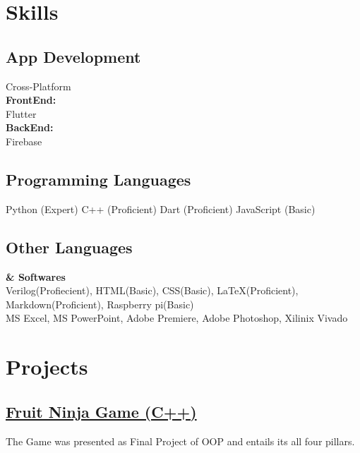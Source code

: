 \documentclass[]{plushcv}
\begin{document}
\begin{minipage}[t]{0.40\textwidth}



\section{Skills}
\subsection{App Development}
Cross-Platform\\
\textbf{FrontEnd:}\\ Flutter \\
\textbf{BackEnd:}\\ Firebase \\

\subsection{Programming Languages}
Python (Expert)
C++ (Proficient)
Dart (Proficient)
JavaScript (Basic)

\subsection{Other Languages}
\textbf{\& Softwares} \\
Verilog(Profiecient), 
HTML(Basic),
CSS(Basic),
LaTeX(Proficient),
Markdown(Proficient), 
Raspberry pi(Basic) \\

MS Excel, 
MS PowerPoint, 
Adobe Premiere, 
Adobe Photoshop, 
Xilinix Vivado


\section{Projects}

    \subsection{\href{https://github.com/smabbasht/CS224-OOP-FruitNinjaGame-cpp}{\textbf{Fruit Ninja Game (C++)}}}
    The Game was presented as Final Project of OOP and entails its all four pillars.


\end{minipage}
\end{document}
